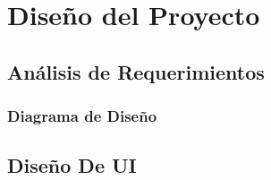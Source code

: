 \chapter{Diseño del Proyecto}

\section{Análisis de Requerimientos}

\subsection{Diagrama de Diseño}

\section{Diseño De UI}

\section{}
